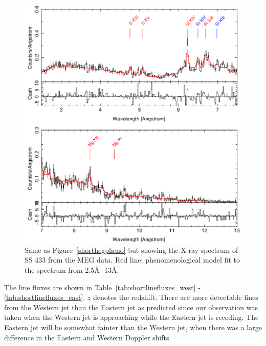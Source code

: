\begin{figure}[h!]
    \centering
    \includegraphics[width = \linewidth]{Chapters/Figures/short_pheno_meg.png}
    \caption{Same as Figure~\ref{shorthegpheno} but showing the X-ray spectrum of SS 433 from the MEG data. Red line: phenomenological model fit to the spectrum from 2.5\AA -  13\AA.}
    \label{shortmegpheno}
\end{figure}

\newpage
\newpage
\newpage
The line fluxes are shown in Table~\ref{tab:shortlinefluxes_west} - \ref{tab:shortlinefluxes_east}.  $z$ denotes the redshift. There are more detectable lines from the Western jet than the Eastern jet as predicted since our observation was taken when the Western jet is approaching while the Eastern jet is receding. The Eastern jet will be somewhat fainter than the Western jet, when there was a large difference in the Eastern and Western Doppler shifts. \par 




